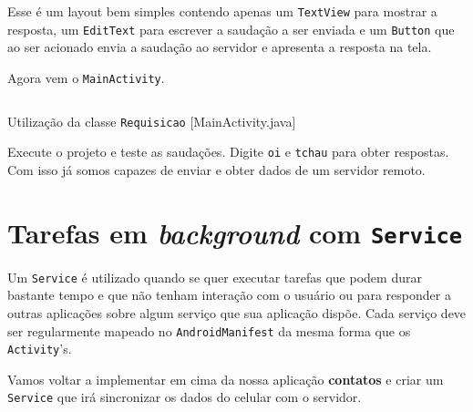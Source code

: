 Esse é um layout bem simples contendo apenas um \texttt{TextView} para mostrar a resposta,
um \texttt{EditText} para escrever a saudação a ser enviada e um \texttt{Button} que ao ser acionado
envia a saudação ao servidor e apresenta a resposta na tela.

Agora vem o \texttt{MainActivity}.

\begin{listing}[H]
  \inputminted[linenos=true,frame=bottomline,tabsize=3]{ java }{ source/MainActivity-15.java }
  \caption{Utilização da classe \texttt{Requisicao} [MainActivity.java]}
\end{listing}

Execute o projeto e teste as saudações. Digite \texttt{oi} e \texttt{tchau} para obter respostas.
Com isso já somos capazes de enviar e obter dados de um servidor remoto.

\section{Tarefas em \textit{background} com \texttt{Service}}

Um \texttt{Service} é utilizado quando se quer executar tarefas que podem durar bastante tempo
e que não tenham interação com o usuário ou para responder a outras aplicações sobre algum serviço
que sua aplicação dispõe. Cada serviço deve ser regularmente mapeado no \texttt{AndroidManifest}
da mesma forma que os \texttt{Activity}'s.

Vamos voltar a implementar em cima da nossa aplicação \textbf{contatos} e criar um \texttt{Service}
que irá sincronizar os dados do celular com o servidor.

